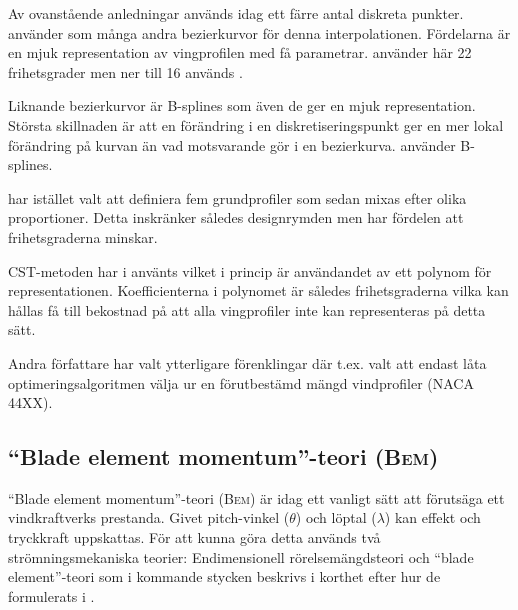 Av ovanstående anledningar används idag ett färre antal diskreta punkter. \citet{5MWkillen} använder som många andra \citep{LowRe,Grasso} bezierkurvor för denna interpolationen. Fördelarna är en mjuk representation av vingprofilen med få parametrar. \citet{5MWkillen} använder här 22 frihetsgrader men ner till 16 används \citep{Grasso}.

Liknande bezierkurvor är B-splines som även de ger en mjuk representation. Största skillnaden är att en förändring i en diskretiseringspunkt ger en mer lokal förändring på kurvan än vad motsvarande gör i en bezierkurva. \citet{Dansken} använder B-splines. 

\citet{Cencelli} har istället valt att definiera fem grundprofiler som sedan mixas efter olika proportioner. Detta inskränker således designrymden men har fördelen att frihetsgraderna minskar.

CST-metoden har i \citet{CST} använts vilket i princip är användandet av ett polynom för representationen. Koefficienterna i polynomet är således frihetsgraderna vilka kan hållas få till bekostnad på att alla vingprofiler inte kan representeras på detta sätt.

Andra författare har valt ytterligare förenklingar där t.ex. \citet{Victoria} valt att endast låta optimeringsalgoritmen välja ur en förutbestämd mängd vindprofiler (NACA 44XX).





\begin{comment}
\subsection{Programmeringsspråk}
Implementering av ett optimeringsproblem likt det studerade kan givetvis göras i vilket programmeringsspråk som helst. Trots det är det stor övervikt för \textsc{MatLab} \citep{CST, Cencelli, 5MWkillen}. \hl{Python används i en studie av de jag arbetat med, men då endast för att kalla på Fortran-rutiner} \citep{Victoria}. %
\end{comment}

\subsection{``Blade element momentum''-teori (\textsc{Bem})}
\label{BEMlitt}

``Blade element momentum''-teori (\textsc{Bem}) är idag ett vanligt sätt att förutsäga ett vindkraftverks prestanda. Givet pitch-vinkel ($\theta$) och löptal ($\lambda$) kan effekt och tryckkraft uppskattas. För att kunna göra detta används två strömningsmekaniska teorier: Endimensionell rörelsemängdsteori och ``blade element''-teori som i kommande stycken beskrivs i korthet efter hur de formulerats i \citet{hansen}.

